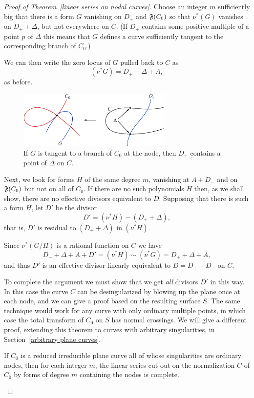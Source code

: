 \begin{proof}[Proof of Theorem~\ref{linear series on nodal curves}]
 Choose an integer $m$ sufficiently big that there is a form $G$ vanishing on  $D_{+}$ and $\adj(C_{0})$ so that
 $\nu^{*}(G)$ vanishes on $D_{+}+\Delta$, but not everywhere on $C$.
 (If $D_{+}$ contains some positive multiple of a point $p$ of $\Delta$ this means that $G$ defines
 a curve sufficiently tangent to the corresponding branch of $C_0$.) 
 
 We can then write the zero locus of $G$ pulled back to $C$ as
$$
(\nu^*G) = D_{+} + \Delta + A,
$$
as before. 

\begin{figure}
\centerline {\includegraphics[width=3.0in]{"main/Fig14-3"}}
\caption{If $G$ is tangent to a branch of $C_{0}$ at the node, then $D_{+}$ contains
a point of $\Delta$ on $C$.}
\label{Fig14.2}
\end{figure}

Next, we look for forms $H$ of the same degree $m$, vanishing at $A+D_{-}$ and on $\adj(C_{0})$
 but not on all of $C_0$. If there are no such polynomials $H$ then, as we shall show,
there are no effective divisors equivalent to $D$. Supposing that there is such a form $H$, let $D'$ be the divisor 
$$
D' = (\nu^*H) -( D_{+} + \Delta),
$$
that is, $D'$ is residual to $( D_{+} + \Delta)$ in $(\nu^*H)$. 

Since $\nu^*(G/H)$ is a rational function on $C$ we have
$$
D_{-} +\Delta + A+ D' = (\nu^*H) \sim (\nu^*G) = D_{+} + \Delta + A,
$$
and thus $D'$ is an effective divisor linearly equivalent to $D = D_{+}-D_{-}$ on $C$.

To complete the argument we must show that we get \emph{all} divisors $D'$ in this way.
In this case the curve $C$ can be desingularized by blowing up the plane once at each node,
and we can give a proof based on the resulting surface $S$. The same technique would work for any curve with only
ordinary multiple points, in which case the total transform of $C_{0}$ on $S$ has normal crossings. We will give a different proof, extending this theorem to curves with arbitrary singularities, in Section~\ref{arbitrary plane curves}.

\begin{proposition}\label{adjoint completeness1}
If $C_{0}$ is a reduced irreducible plane curve all of whose singularities are ordinary nodes, then for each
integer $m$,
the linear series cut out on the normalization $C$ of $C_{0}$ by forms of degree $m$ containing the nodes
is complete.
\end{proposition}


\end{proof}
